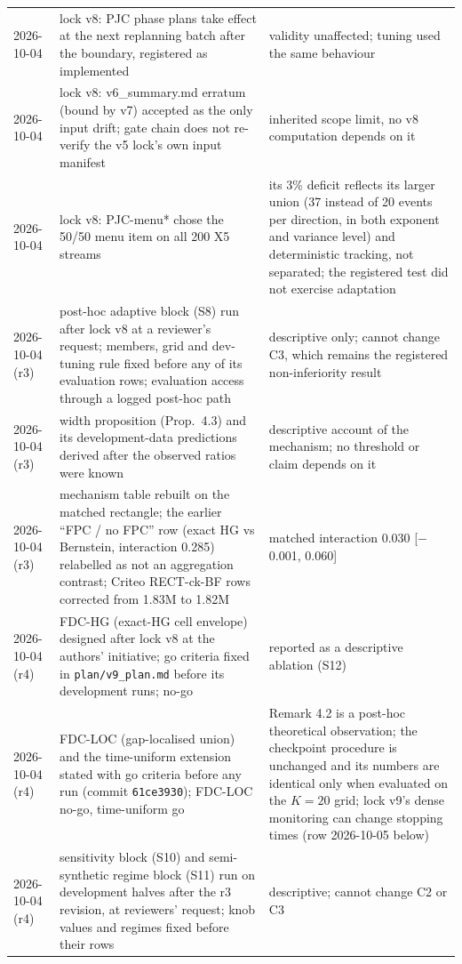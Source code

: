 \documentclass[sigconf,anonymous,review]{acmart}
\begin{document}
\begin{table}[t]
\begin{tabular}{@{}l>{\raggedright\arraybackslash}p{6.6cm}>{\raggedright\arraybackslash}p{7.6cm}@{}}
2026-10-04 & lock v8: PJC phase plans take effect at the next replanning batch after the boundary, registered as implemented & validity unaffected; tuning used the same behaviour \\
2026-10-04 & lock v8: v6\_summary.md erratum (bound by v7) accepted as the only input drift; gate chain does not re-verify the v5 lock's own input manifest & inherited scope limit, no v8 computation depends on it \\
2026-10-04 & lock v8: PJC-menu* chose the 50/50 menu item on all 200 X5 streams & its 3\% deficit reflects its larger union (37 instead of 20 events per direction, in both exponent and variance level) and deterministic tracking, not separated; the registered test did not exercise adaptation \\
2026-10-04 (r3) & post-hoc adaptive block (S8) run after lock v8 at a reviewer's request; members, grid and dev-tuning rule fixed before any of its evaluation rows; evaluation access through a logged post-hoc path & descriptive only; cannot change C3, which remains the registered non-inferiority result \\
2026-10-04 (r3) & width proposition (Prop.~4.3) and its development-data predictions derived after the observed ratios were known & descriptive account of the mechanism; no threshold or claim depends on it \\
2026-10-04 (r3) & mechanism table rebuilt on the matched rectangle; the earlier ``FPC / no FPC'' row (exact HG vs Bernstein, interaction 0.285) relabelled as not an aggregation contrast; Criteo RECT-ck-BF rows corrected from 1.83M to 1.82M & matched interaction 0.030 [$-$0.001, 0.060] \\
2026-10-04 (r4) & FDC-HG (exact-HG cell envelope) designed after lock v8 at the authors' initiative; go criteria fixed in \texttt{plan/v9\_plan.md} before its development runs; no-go & reported as a descriptive ablation (S12) \\
2026-10-04 (r4) & FDC-LOC (gap-localised union) and the time-uniform extension stated with go criteria before any run (commit \texttt{61ce3930}); FDC-LOC no-go, time-uniform go & Remark 4.2 is a post-hoc theoretical observation; the checkpoint procedure is unchanged and its numbers are identical only when evaluated on the $K = 20$ grid; lock v9's dense monitoring can change stopping times (row 2026-10-05 below) \\
2026-10-04 (r4) & sensitivity block (S10) and semi-synthetic regime block (S11) run on development halves after the r3 revision, at reviewers' request; knob values and regimes fixed before their rows & descriptive; cannot change C2 or C3 \\

\end{tabular}
\end{table}
\end{document}
